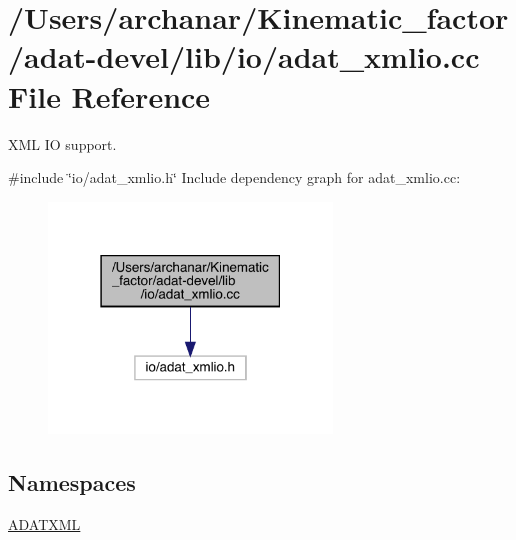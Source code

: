 \hypertarget{adat-devel_2lib_2io_2adat__xmlio_8cc}{}\section{/\+Users/archanar/\+Kinematic\+\_\+factor/adat-\/devel/lib/io/adat\+\_\+xmlio.cc File Reference}
\label{adat-devel_2lib_2io_2adat__xmlio_8cc}


X\+ML IO support.  


{\ttfamily \#include \char`\"{}io/adat\+\_\+xmlio.\+h\char`\"{}}\newline
Include dependency graph for adat\+\_\+xmlio.\+cc\+:
\nopagebreak
\begin{figure}[H]
\begin{center}
\leavevmode
\includegraphics[width=214pt]{de/daf/adat-devel_2lib_2io_2adat__xmlio_8cc__incl}
\end{center}
\end{figure}
\subsection*{Namespaces}
\begin{DoxyCompactItemize}
\item 
 \mbox{\hyperlink{namespaceADATXML}{A\+D\+A\+T\+X\+ML}}
\end{DoxyCompactItemize}
